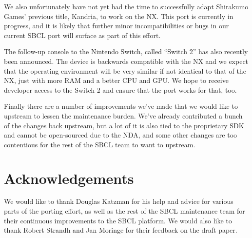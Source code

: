 \documentclass[format=sigconf]{acmart}
\begin{document}
We also unfortunately have not yet had the time to successfully adapt Shirakumo Games' previous title, Kandria, to work on the NX. This port is currently in progress, and it is likely that further minor incompatibilities or bugs in our current SBCL port will surface as part of this effort.

The follow-up console to the Nintendo Switch, called ``Switch 2'' has also recently been announced. The device is backwards compatible with the NX and we expect that the operating environment will be very similar if not identical to that of the NX, just with more RAM and a better CPU and GPU. We hope to receive developer access to the Switch 2 and ensure that the port works for that, too.

Finally there are a number of improvements we've made that we would like to upstream to lessen the maintenance burden. We've already contributed a bunch of the changes back upstream, but a lot of it is also tied to the proprietary SDK and cannot be open-sourced due to the NDA, and some other changes are too contentious for the rest of the SBCL team to want to upstream.

\section{Acknowledgements}\label{acknowledgements}
We would like to thank Douglas Katzman for his help and advice for various parts of the porting effort, as well as the rest of the SBCL maintenance team for their continuous improvements to the SBCL platform. We would also like to thank Robert Strandh and Jan Moringe for their feedback on the draft paper.


\end{document}
